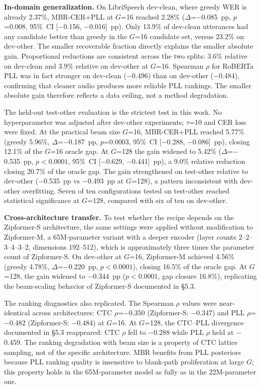 \textbf{In-domain generalization.} On LibriSpeech dev-clean, where greedy WER is already 2.37\%,
MBR-CER+PLL at $G$=16 reached 2.28\% ($\Delta$=$-$0.085~pp, $p$=0.008, 95\%\ CI
[$-$0.156, $-$0.016]~pp). Only 13.9\% of dev-clean utterances had any candidate
better than greedy in the $G$=16 candidate set, versus 23.2\% on dev-other. The smaller
recoverable fraction directly explains the smaller absolute gain. Proportional reductions are
consistent across the two splits: 3.6\% relative on dev-clean and 3.9\% relative on dev-other at
$G$=16. Spearman $\rho$ for RoBERTa PLL was in fact stronger on dev-clean ($-$0.496) than on
dev-other ($-$0.484), confirming that cleaner audio produces more reliable PLL rankings. The
smaller absolute gain therefore reflects a data ceiling, not a method degradation.

The held-out test-other evaluation is the strictest test in this work. No hyperparameter was
adjusted after dev-other experiments; $\tau$=10 and CER loss were fixed. At the practical beam
size $G$=16, MBR-CER+PLL reached 5.77\% (greedy 5.96\%, $\Delta$=$-$0.187~pp, $p$=0.0003,
95\%\ CI [$-$0.288, $-$0.086]~pp), closing 12.1\% of the $G$=16 oracle gap. At $G$=128 the gain
widened to 5.42\% ($\Delta$=$-$0.535~pp, $p<0.0001$, 95\%\ CI [$-$0.629, $-$0.441]~pp), a 9.0\%
relative reduction closing 20.7\% of the oracle gap.
The gain strengthened on test-other relative to
dev-other ($-$0.535~pp vs $-$0.493~pp at $G$=128), a pattern inconsistent with dev-other overfitting. Seven of ten configurations tested on test-other reached statistical
significance at $G$=128, compared with six of ten on dev-other.

\textbf{Cross-architecture transfer.} To test whether the recipe depends on the Zipformer-S
architecture, the same settings were applied without modification to Zipformer-M, a 65M-parameter
variant with a deeper encoder (layer counts 2--2--3--4--3--2, dimensions 192--512), which is
approximately three times the parameter count of Zipformer-S. On
dev-other at $G$=16, Zipformer-M achieved 4.56\% (greedy 4.78\%, $\Delta$=$-$0.220~pp,
$p<0.0001$), closing 16.5\% of the oracle gap. At $G$=128, the gain widened to $-$0.344~pp
($p<0.0001$, gap closure 16.8\%), replicating the beam-scaling behavior of Zipformer-S documented
in §5.3.

The ranking diagnostics also replicated. The Spearman $\rho$ values were near-identical across architectures: CTC
$\rho$=$-$0.350 (Zipformer-S: $-$0.347) and PLL $\rho$=$-$0.482 (Zipformer-S: $-$0.484) at
$G$=16. At $G$=128, the CTC--PLL divergence documented in §5.3 reappeared:
CTC $\rho$ fell to $-$0.288 while PLL $\rho$ held at $-$0.459. The ranking
degradation with beam size is a property of CTC lattice sampling, not of the specific
architecture. MBR benefits from PLL posteriors because PLL ranking quality is insensitive to
blank-path proliferation at large $G$; this property holds in the 65M-parameter model as fully
as in the 22M-parameter one.

